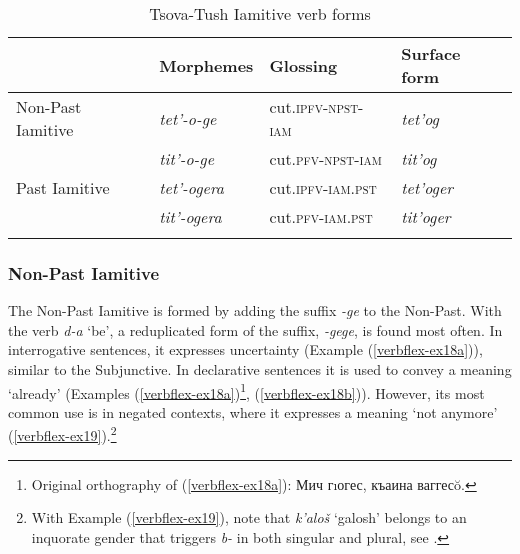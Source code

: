 \begin{table}
	\begin{tabular}{llll}
		
		\lsptoprule
		& Morphemes & Glossing & Surface form \\
	\midrule
		
		
		Non-Past Iamitive & \textit{tet'-o-ge} & cut.\textsc{ipfv-npst-iam} & \textit{tet'og} \\
		& \textit{tit'-o-ge} & cut.\textsc{pfv-npst-iam} & \textit{tit'og} \\
		
		Past Iamitive & \textit{tet'-ogera} & cut.\textsc{ipfv-iam.pst} & \textit{tet'oger} \\
		& \textit{tit'-ogera} & cut.\textsc{pfv-iam.pst} & \textit{tit'oger} \\
		
		\lspbottomrule
		
	\end{tabular}
	\caption{Tsova-Tush Iamitive verb forms}
	\label{table-iamverbflex}
\end{table}

\subsubsection{Non-Past Iamitive}

The Non-Past Iamitive is formed by adding the suffix \textit{-ge} to the Non-Past. With the verb \textit{d-a} `be', a reduplicated form of the suffix, \textit{-gege}, is found most often. In interrogative sentences, it expresses uncertainty (Example (\ref{verbflex-ex18a})), similar to the Subjunctive. In declarative sentences it is used to convey a meaning `already' (Examples (\ref{verbflex-ex18a})\footnote{Original orthography of (\ref{verbflex-ex18a}): Мич гıогес, къаина ваггес\u{o}.}, (\ref{verbflex-ex18b})). However, its most common use is in negated contexts, where it expresses a meaning `not anymore' (\ref{verbflex-ex19}).\footnote{With Example  (\ref{verbflex-ex19}), note that \textit{k'aloš} `galosh' belongs to an inquorate gender that triggers \textit{b-} in both singular and plural, see .}


